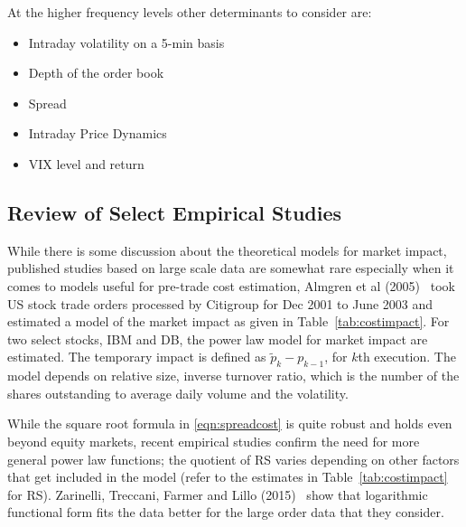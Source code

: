 At the higher frequency levels other determinants to consider are:
	\begin{itemize}
	\item Intraday volatility on a 5-min basis
	\item Depth of the order book
	\item Spread
	\item Intraday Price Dynamics
	\item VIX level and return \twomedskip
	\end{itemize} \label{in:transcost4}



\subsection{Review of Select Empirical Studies}

While there is some discussion about the theoretical models for market impact, published studies based on large scale data are somewhat rare especially when it comes to models useful for pre-trade cost estimation, Almgren et al (2005)~\cite{athl} took US stock trade orders processed by Citigroup for Dec 2001 to June 2003 and estimated a model of the market impact as given in Table~\ref{tab:costimpact}. For two select stocks, IBM and DB, the power law model for market impact are estimated. The temporary impact is defined as $\widetilde{p}_k - p_{k-1}$, for $k$th execution. The model depends on relative size, inverse turnover ratio, which is the number of the shares outstanding to average daily volume and the volatility.


While the square root formula in \eqref{eqn:spreadcost} is quite robust and holds even beyond equity markets, recent empirical studies confirm the need for more general power law functions; the quotient of RS varies depending on other factors that get included in the model (refer to the estimates in Table~\ref{tab:costimpact} for RS). Zarinelli, Treccani, Farmer and Lillo (2015)~\cite{zar} show that logarithmic functional form fits the data better for the large order data that they consider. 


